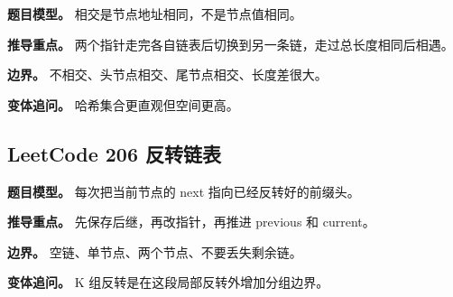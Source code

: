 \textbf{题目模型。} 相交是节点地址相同，不是节点值相同。

\textbf{推导重点。} 两个指针走完各自链表后切换到另一条链，走过总长度相同后相遇。

\textbf{边界。} 不相交、头节点相交、尾节点相交、长度差很大。

\textbf{变体追问。} 哈希集合更直观但空间更高。

\subsection{LeetCode 206 反转链表}

\textbf{题目模型。} 每次把当前节点的 next 指向已经反转好的前缀头。

\textbf{推导重点。} 先保存后继，再改指针，再推进 previous 和 current。

\textbf{边界。} 空链、单节点、两个节点、不要丢失剩余链。

\textbf{变体追问。} K 组反转是在这段局部反转外增加分组边界。
